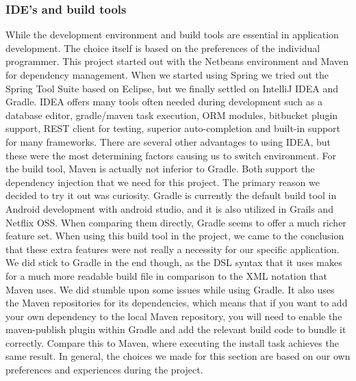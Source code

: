 \documentclass[12pt]{article}
\begin{document}
\subsubsection{IDE's and build tools}
While the development environment and build tools are essential in application development. The choice itself is based on the preferences of the individual programmer. This project started out with the Netbeans environment and Maven for dependency management. When we started using Spring we tried out the Spring Tool Suite based on Eclipse, but we finally settled on IntelliJ IDEA and Gradle. IDEA offers many tools often needed during development such as a database editor, gradle/maven task execution, ORM modules, bitbucket plugin support, REST client for testing, superior auto-completion and built-in support for many frameworks. There are several other advantages to using IDEA, but these were the most determining factors causing us to switch environment. For the build tool, Maven is actually not inferior to Gradle. Both support the dependency injection that we need for this project. The primary reason we decided to try it out was curiosity. Gradle is currently the default build tool in Android development with android studio, and it is also utilized in Grails and Netflix OSS. When comparing them directly, Gradle seems to offer a much richer feature set. \cite{GradleVsMaven48:online} When using this build tool in the project, we came to the conclusion that these extra features were not really a necessity for our specific application. We did stick to Gradle in the end though, as the DSL syntax that it uses makes for a much more readable build file in comparison to the XML notation that Maven uses. We did stumble upon some issues while using Gradle. It also uses the Maven repositories for its dependencies, which means that if you want to add your own dependency to the local Maven repository, you will need to enable the maven-publish plugin within Gradle and add the relevant build code to bundle it correctly. Compare this to Maven, where executing the install task achieves the same result. In general, the choices we made for this section are based on our own preferences and experiences during the project.
\end{document}
